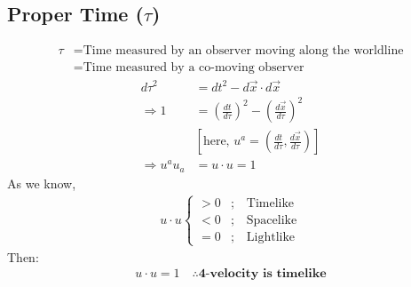 \documentclass[14pt]{article} %
\begin{document}
\subsection*{Proper Time ($\tau$)}
\begin{align*}
    \tau &= \text{Time measured by an observer moving along the worldline} \\
    &= \text{Time measured by a co-moving observer}
\end{align*}
\begin{align*}
    d\tau^2 &= dt^2 - d\vec{x} \cdot d\vec{x} \\
    \Rightarrow 1 &= \left( \frac{dt}{d\tau} \right)^2 - \left( \frac{d\vec{x}}{d\tau} \right)^2 \\
   &\left[\text{here, } u^a = \left( \frac{dt}{d\tau}, \frac{d\vec{x}}{d\tau} \right)\right] \\
    \Rightarrow u^a u_a &= u \cdot u = 1
\end{align*}
As we know,
\begin{align*}
\boxed{u \cdot u 
\begin{cases}
>0 & ;\quad  \text{Timelike} \\
<0 & ;\quad \text{Spacelike} \\
=0 & ;\quad \text{Lightlike}
\end{cases}}
\end{align*}
Then:
\begin{align*}
u \cdot u = 1 \quad \therefore \textbf{4-velocity is timelike}
\end{align*}
\vspace{-1cm}
\end{document}
